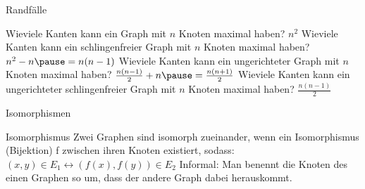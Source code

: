 \documentclass[handout]{beamer}
\begin{document}
\begin{frame}{Randfälle}
	\begin{itemize}
		\pitem Wieviele Kanten kann ein Graph mit $n$ Knoten maximal haben? \pause $n^2$
		\pitem Wieviele Kanten kann ein schlingenfreier Graph mit $n$ Knoten maximal haben? \pause $n^2-n \p = n(n-1)$
		\pitem Wieviele Kanten kann ein ungerichteter Graph mit $n$ Knoten maximal haben? \pause $\frac{n(n-1)}{2} + n\p = \frac{n(n+1)}{2}$
		\pitem Wieviele Kanten kann ein ungerichteter schlingenfreier Graph mit $n$ Knoten maximal haben? \pause $\frac{n(n-1)}{2}$
	\end{itemize}
\end{frame}

\begin{frame}{Isomorphismen}
\begin{block}{Isomorphismus}
	Zwei Graphen sind isomorph zueinander, wenn ein Isomorphismus (Bijektion) f zwischen ihren Knoten existiert, sodass: $(x, y) \in E_1 \leftrightarrow (f(x), f(y)) \in E_2$
	\newline
	Informal: Man benennt die Knoten des einen Graphen so um, dass der andere Graph dabei herauskommt.
\end{block}
\end{frame}

\end{document}
